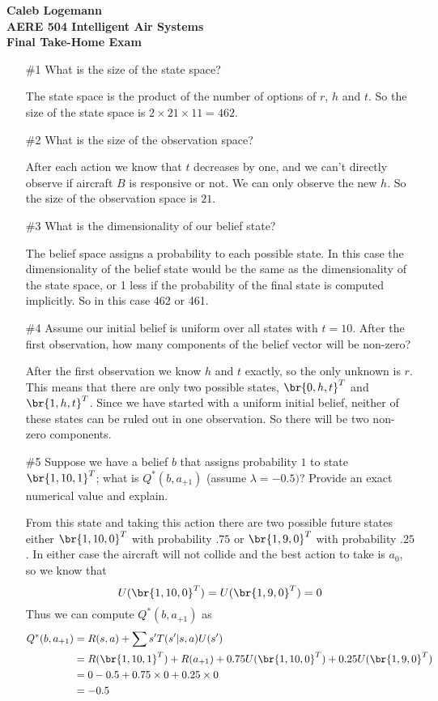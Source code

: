 \documentclass[12pt, oneside]{article}
\begin{document}
\noindent \textbf{\Large{Caleb Logemann \\
AERE 504 Intelligent Air Systems \\
Final Take-Home Exam
}}

\begin{enumerate}
  \item[\#1] %
    What is the size of the state space?

    The state space is the product of the number of options of $r$, $h$ and $t$.
    So the size of the state space is $2 \times 21 \times 11 = 462$.

  \item[\#2] %
    What is the size of the observation space?

    After each action we know that $t$ decreases by one, and we can't directly
    observe if aircraft $B$ is responsive or not.
    We can only observe the new $h$.
    So the size of the observation space is $21$.

  \item[\#3] %
    What is the dimensionality of our belief state?

    The belief space assigns a probability to each possible state.
    In this case the dimensionality of the belief state would be the same as the
    dimensionality of the state space, or 1 less if the probability of the final
    state is computed implicitly.
    So in this case 462 or 461.

  \item[\#4] %
    Assume our initial belief is uniform over all states with $t = 10$.
    After the first observation, how many components of the belief vector will
    be non-zero?

    After the first observation we know $h$ and $t$ exactly, so the only
    unknown is $r$.
    This means that there are only two possible states, $\br{0, h, t}^T$ and 
    $\br{1, h, t}^T$.
    Since we have started with a uniform initial belief, neither of these states
    can be ruled out in one observation.
    So there will be two non-zero components.

  \item[\#5] %
    Suppose we have a belief $b$ that assigns probability $1$ to state
    $\br{1, 10, 1}^T$; what is $Q^*(b, a_{+1})$ (assume $\lambda = -0.5)$?
    Provide an exact numerical value and explain.

    From this state and taking this action there are two possible future states
    either $\br{1, 10, 0}^T$ with probability $.75$ or $\br{1, 9, 0}^T$ with
    probability $.25$.
    In either case the aircraft will not collide and the best action to take
    is $a_0$, so we know that
    \[
      U(\br{1, 10, 0}^T) = U(\br{1, 9, 0}^T) = 0
    \]
    Thus we can compute $Q^*(b, a_{+1})$ as
    \begin{align*}
      Q^*(b, a_{+1}) &= R(s, a) + \sum{s'}{}{T(s'|s, a)U(s')} \\
      &= R(\br{1, 10, 1}^T) + R(a_{+1}) + 0.75 U(\br{1, 10, 0}^T) + 0.25 U(\br{1, 9, 0}^T)\\
      &= 0 - 0.5 + 0.75 \times 0 + 0.25 \times 0 \\
      &= -0.5
    \end{align*}


\end{enumerate}
\end{document}
